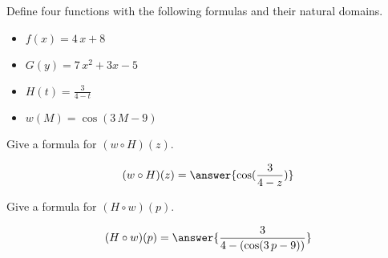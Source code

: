 \documentclass{ximera}
\author{Lee Wayand}
\begin{document}
\begin{exercise}




Define four functions with the following formulas and their natural domains. \\


\begin{itemize}
  \item $f(x) = 4 \, x + 8$
  \item $G(y) = 7 \, x^2 + 3 x - 5$
  \item $H(t) = \frac{3}{4 - t}$
  \item $w(M) = \cos(3 \, M - 9)$ 
\end{itemize}


\begin{question}


Give a formula for $(w \circ H)(z)$.

\[
(w \circ H)(z) = \answer{\cos(\frac{3}{4 - z})}
\]

\end{question}






\begin{question}


Give a formula for $(H \circ w)(p)$.

\[
(H \circ w)(p) = \answer{\frac{3}{4 - (\cos(3 \, p - 9))}}
\]

\end{question}




\end{exercise}
\end{document}
